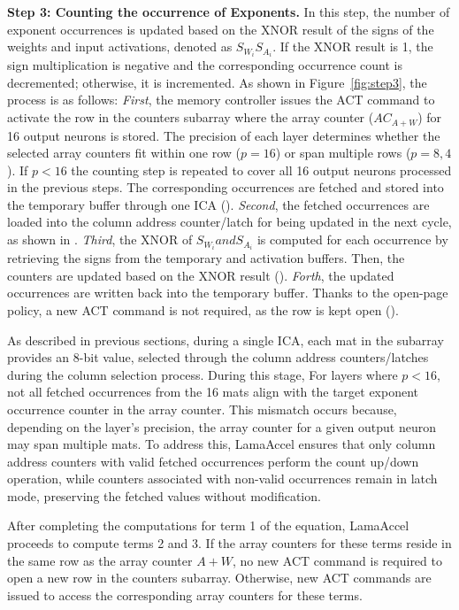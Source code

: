 \textbf{Step 3: Counting the occurrence of Exponents.} In this step, the number of exponent occurrences is updated based on the XNOR result of the signs of the weights and input activations, denoted as $S_{W_{i}}S_{A_{i}}$. If the XNOR result is 1, the sign multiplication is negative and the corresponding occurrence count is decremented; otherwise, it is incremented. As shown in Figure~\ref{fig:step3}, the process is as follows: \textit{First}, the memory controller issues the ACT command to activate the row in the counters subarray where the array counter ($AC_{A+W}$) for 16 output neurons is stored. The precision of each layer determines whether the selected array counters fit within one row ($p=16$) or span multiple rows ($p=8,4$). If $p<16$ the counting step is repeated to cover all 16 output neurons processed in the previous steps. The corresponding occurrences are fetched and stored into the temporary buffer through one ICA (). \textit{Second}, the fetched occurrences are loaded into the column address counter/latch for being updated in the next cycle, as shown in . \textit{Third}, the XNOR of $S_{W_{i}} and S_{A_{i}}$ is computed for each occurrence by retrieving the signs from the temporary and activation buffers. Then, the counters are updated based on the XNOR result (). \textit{Forth}, the updated occurrences are written back into the temporary buffer. Thanks to the open-page policy, a new ACT command is not required, as the row is kept open ().

As described in previous sections, during a single ICA, each mat in the subarray provides an 8-bit value, selected through the column address counters/latches during the column selection process. During this stage, For layers where $p<16$, not all fetched occurrences from the 16 mats align with the target exponent occurrence counter in the array counter. This mismatch occurs because, depending on the layer's precision, the array counter for a given output neuron may span multiple mats. To address this, LamaAccel ensures that only column address counters with valid fetched occurrences perform the count up/down operation, while counters associated with non-valid occurrences remain in latch mode, preserving the fetched values without modification.

After completing the computations for term 1 of the equation, LamaAccel proceeds to compute terms 2 and 3. If the array counters for these terms reside in the same row as the array counter $A+W$, no new ACT command is required to open a new row in the counters subarray. Otherwise, new ACT commands are issued to access the corresponding array counters for these terms.


